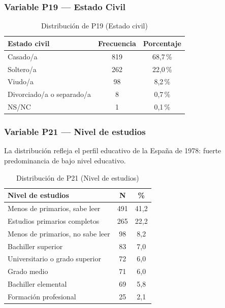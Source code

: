 \documentclass[12pt,a4paper]{article}
\newcommand{\thead}[1]{\cellcolor{tableheader}\color{white}\textbf{#1}}
\begin{document}
\subsubsection{Variable P19 — Estado Civil}

\begin{table}[H]
\centering
\renewcommand{\arraystretch}{1.3}
\begin{tabular}{lcc}
\toprule
\thead{Estado civil} & \thead{Frecuencia} & \thead{Porcentaje} \\
\midrule
Casado/a                  & 819 & 68,7\,\% \\
\rowcolor{tablerow}
Soltero/a                 & 262 & 22,0\,\% \\
Viudo/a                   &  98 &  8,2\,\% \\
\rowcolor{tablerow}
Divorciado/a o separado/a &   8 &  0,7\,\% \\
NS/NC                     &   1 &  0,1\,\% \\
\bottomrule
\end{tabular}
\caption{Distribución de P19 (Estado civil)}
\end{table}

\subsubsection{Variable P21 — Nivel de estudios}

La distribución refleja el perfil educativo de la España de 1978: fuerte predominancia de bajo nivel educativo.

\begin{table}[H]
\centering
\renewcommand{\arraystretch}{1.3}
\begin{tabularx}{\linewidth}{X c c}
\toprule
\thead{Nivel de estudios} & \thead{N} & \thead{\%} \\
\midrule
Menos de primarios, sabe leer    & 491 & 41,2 \\
\rowcolor{tablerow}
Estudios primarios completos     & 265 & 22,2 \\
Menos de primarios, no sabe leer &  98 &  8,2 \\
\rowcolor{tablerow}
Bachiller superior               &  83 &  7,0 \\
Universitario o grado superior   &  72 &  6,0 \\
\rowcolor{tablerow}
Grado medio                      &  71 &  6,0 \\
Bachiller elemental              &  69 &  5,8 \\
\rowcolor{tablerow}
Formación profesional            &  25 &  2,1 \\
\bottomrule
\end{tabularx}
\caption{Distribución de P21 (Nivel de estudios)}
\end{table}
\end{document}
